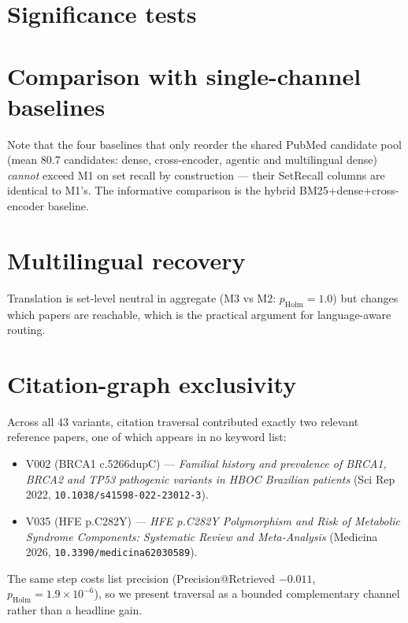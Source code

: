 \documentclass[11pt]{article}
\newcommand{\code}[1]{\texttt{#1}}
\begin{document}
\section{Significance tests}


\section{Comparison with single-channel baselines}


Note that the four baselines that only reorder the shared PubMed candidate pool
(mean 80.7 candidates: dense, cross-encoder, agentic and multilingual dense)
\emph{cannot} exceed M1 on set recall by construction --- their SetRecall
columns are identical to M1's. The informative comparison is the hybrid
BM25+dense+cross-encoder baseline.



\section{Multilingual recovery}


Translation is set-level neutral in aggregate (M3 vs M2:
$p_{\mathrm{Holm}}=1.0$) but changes which papers are reachable, which is the
practical argument for language-aware routing.

\section{Citation-graph exclusivity}
Across all 43 variants, citation traversal contributed exactly two relevant
reference papers, one of which appears in no keyword list:
\begin{itemize}\itemsep2pt
  \item V002 (BRCA1 c.5266dupC) --- \emph{Familial history and prevalence of
        BRCA1, BRCA2 and TP53 pathogenic variants in HBOC Brazilian patients}
        (Sci Rep 2022, \code{10.1038/s41598-022-23012-3}).
  \item V035 (HFE p.C282Y) --- \emph{HFE p.C282Y Polymorphism and Risk of
        Metabolic Syndrome Components: Systematic Review and Meta-Analysis}
        (Medicina 2026, \code{10.3390/medicina62030589}).
\end{itemize}
The same step costs list precision (Precision@Retrieved $-0.011$,
$p_{\mathrm{Holm}}=1.9\times10^{-6}$), so we present traversal as a bounded
complementary channel rather than a headline gain.
\end{document}
